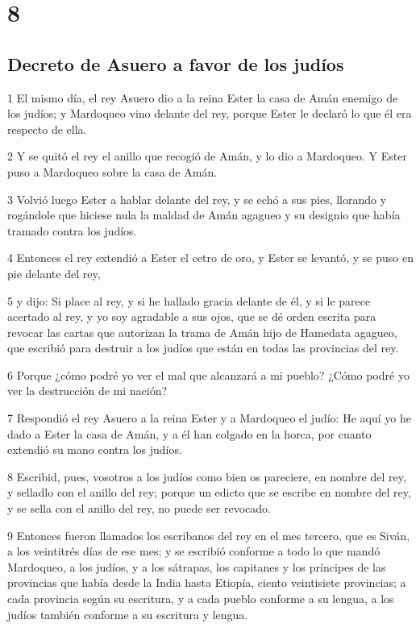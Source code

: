 \chapter{8}

\section*{Decreto de Asuero a favor de los judíos }

\par 1 El mismo día, el rey Asuero dio a la reina Ester la casa de Amán enemigo de los judíos; y Mardoqueo vino delante del rey, porque Ester le declaró lo que él era respecto de ella.
\par 2 Y se quitó el rey el anillo que recogió de Amán, y lo dio a Mardoqueo. Y Ester puso a Mardoqueo sobre la casa de Amán.
\par 3 Volvió luego Ester a hablar delante del rey, y se echó a sus pies, llorando y rogándole que hiciese nula la maldad de Amán agagueo y su designio que había tramado contra los judíos.
\par 4 Entonces el rey extendió a Ester el cetro de oro, y Ester se levantó, y se puso en pie delante del rey,
\par 5 y dijo: Si place al rey, y si he hallado gracia delante de él, y si le parece acertado al rey, y yo soy agradable a sus ojos, que se dé orden escrita para revocar las cartas que autorizan la trama de Amán hijo de Hamedata agagueo, que escribió para destruir a los judíos que están en todas las provincias del rey.
\par 6 Porque ¿cómo podré yo ver el mal que alcanzará a mi pueblo? ¿Cómo podré yo ver la destrucción de mi nación?
\par 7 Respondió el rey Asuero a la reina Ester y a Mardoqueo el judío: He aquí yo he dado a Ester la casa de Amán, y a él han colgado en la horca, por cuanto extendió su mano contra los judíos.
\par 8 Escribid, pues, vosotros a los judíos como bien os pareciere, en nombre del rey, y selladlo con el anillo del rey; porque un edicto que se escribe en nombre del rey, y se sella con el anillo del rey, no puede ser revocado.
\par 9 Entonces fueron llamados los escribanos del rey en el mes tercero, que es Siván, a los veintitrés días de ese mes; y se escribió conforme a todo lo que mandó Mardoqueo, a los judíos, y a los sátrapas, los capitanes y los príncipes de las provincias que había desde la India hasta Etiopía, ciento veintisiete provincias; a cada provincia según su escritura, y a cada pueblo conforme a su lengua, a los judíos también conforme a su escritura y lengua.
